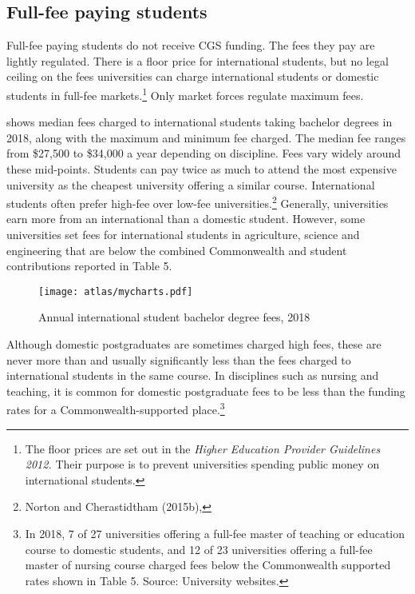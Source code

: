 \documentclass{grattan}
\begin{document}
%
\subsection{Full-fee paying students}\label{subsec:full-fee-paying-students}

Full-fee paying students do not receive CGS funding. The fees they pay are lightly regulated. There is a floor price for international students, but no legal ceiling on the fees universities can charge international students or domestic students in full-fee markets.\footnote{The floor prices are set out in the \emph{Higher Education Provider Guidelines 2012.} Their purpose is to prevent universities spending public money on international students.} Only market forces regulate maximum fees.

 shows median fees charged to international students taking bachelor degrees in 2018, along with the maximum and minimum fee charged. The median fee ranges from \$27,500 to \$34,000 a year depending on discipline. Fees vary widely around these mid-points. Students can pay twice as much to attend the most expensive university as the cheapest university offering a similar course. International students often prefer high-fee over low-fee universities.\footnote{Norton and Cherastidtham (2015b), } Generally, universities earn more from an international than a domestic student. However, some universities set fees for international students in agriculture, science and engineering that are below the combined Commonwealth and student contributions reported in Table 5.


    \begin{figure} %
    \caption{Annual international student bachelor degree fees, 2018}\label{fig:annual-international-student-bachelor-degree-fees-2018}
    \texttt{[image: atlas/mycharts.pdf]}
    \end{figure}



Although domestic postgraduates are sometimes charged high fees, these are never more than and usually significantly less than the fees charged to international students in the same course. In disciplines such as nursing and teaching, it is common for domestic postgraduate fees to be less than the funding rates for a Commonwealth-supported place.\footnote{In 2018, 7 of 27 universities offering a full-fee master of teaching or education course to domestic students, and 12 of 23 universities offering a full-fee master of nursing course charged fees below the Commonwealth supported rates shown in Table 5. Source: University websites.}
\end{document}
